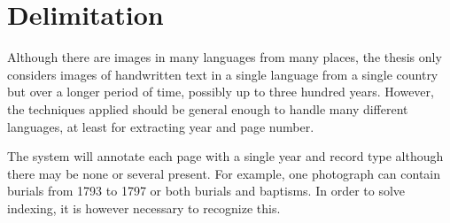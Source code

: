 \section{Delimitation}

Although there are images in many languages from many places, the thesis only considers images of handwritten text in a single language from a single country but over a longer period of time, possibly up to three hundred years.
However, the techniques applied should be general enough to handle many different languages, at least for extracting year and page number.


The system will annotate each page with a single year and record type although there may be none or several present. For example, one photograph can contain burials from 1793 to 1797 or both burials and baptisms. In order to solve indexing, it is however necessary to recognize this.
